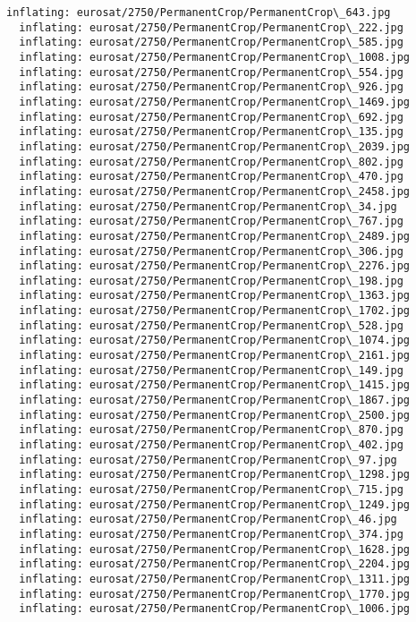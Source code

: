\documentclass[11pt]{article}
\begin{document}
\begin{Verbatim}[commandchars=\\\{\}]
  inflating: eurosat/2750/PermanentCrop/PermanentCrop\_643.jpg
  inflating: eurosat/2750/PermanentCrop/PermanentCrop\_222.jpg
  inflating: eurosat/2750/PermanentCrop/PermanentCrop\_585.jpg
  inflating: eurosat/2750/PermanentCrop/PermanentCrop\_1008.jpg
  inflating: eurosat/2750/PermanentCrop/PermanentCrop\_554.jpg
  inflating: eurosat/2750/PermanentCrop/PermanentCrop\_926.jpg
  inflating: eurosat/2750/PermanentCrop/PermanentCrop\_1469.jpg
  inflating: eurosat/2750/PermanentCrop/PermanentCrop\_692.jpg
  inflating: eurosat/2750/PermanentCrop/PermanentCrop\_135.jpg
  inflating: eurosat/2750/PermanentCrop/PermanentCrop\_2039.jpg
  inflating: eurosat/2750/PermanentCrop/PermanentCrop\_802.jpg
  inflating: eurosat/2750/PermanentCrop/PermanentCrop\_470.jpg
  inflating: eurosat/2750/PermanentCrop/PermanentCrop\_2458.jpg
  inflating: eurosat/2750/PermanentCrop/PermanentCrop\_34.jpg
  inflating: eurosat/2750/PermanentCrop/PermanentCrop\_767.jpg
  inflating: eurosat/2750/PermanentCrop/PermanentCrop\_2489.jpg
  inflating: eurosat/2750/PermanentCrop/PermanentCrop\_306.jpg
  inflating: eurosat/2750/PermanentCrop/PermanentCrop\_2276.jpg
  inflating: eurosat/2750/PermanentCrop/PermanentCrop\_198.jpg
  inflating: eurosat/2750/PermanentCrop/PermanentCrop\_1363.jpg
  inflating: eurosat/2750/PermanentCrop/PermanentCrop\_1702.jpg
  inflating: eurosat/2750/PermanentCrop/PermanentCrop\_528.jpg
  inflating: eurosat/2750/PermanentCrop/PermanentCrop\_1074.jpg
  inflating: eurosat/2750/PermanentCrop/PermanentCrop\_2161.jpg
  inflating: eurosat/2750/PermanentCrop/PermanentCrop\_149.jpg
  inflating: eurosat/2750/PermanentCrop/PermanentCrop\_1415.jpg
  inflating: eurosat/2750/PermanentCrop/PermanentCrop\_1867.jpg
  inflating: eurosat/2750/PermanentCrop/PermanentCrop\_2500.jpg
  inflating: eurosat/2750/PermanentCrop/PermanentCrop\_870.jpg
  inflating: eurosat/2750/PermanentCrop/PermanentCrop\_402.jpg
  inflating: eurosat/2750/PermanentCrop/PermanentCrop\_97.jpg
  inflating: eurosat/2750/PermanentCrop/PermanentCrop\_1298.jpg
  inflating: eurosat/2750/PermanentCrop/PermanentCrop\_715.jpg
  inflating: eurosat/2750/PermanentCrop/PermanentCrop\_1249.jpg
  inflating: eurosat/2750/PermanentCrop/PermanentCrop\_46.jpg
  inflating: eurosat/2750/PermanentCrop/PermanentCrop\_374.jpg
  inflating: eurosat/2750/PermanentCrop/PermanentCrop\_1628.jpg
  inflating: eurosat/2750/PermanentCrop/PermanentCrop\_2204.jpg
  inflating: eurosat/2750/PermanentCrop/PermanentCrop\_1311.jpg
  inflating: eurosat/2750/PermanentCrop/PermanentCrop\_1770.jpg
  inflating: eurosat/2750/PermanentCrop/PermanentCrop\_1006.jpg

\end{Verbatim}
\end{document}
